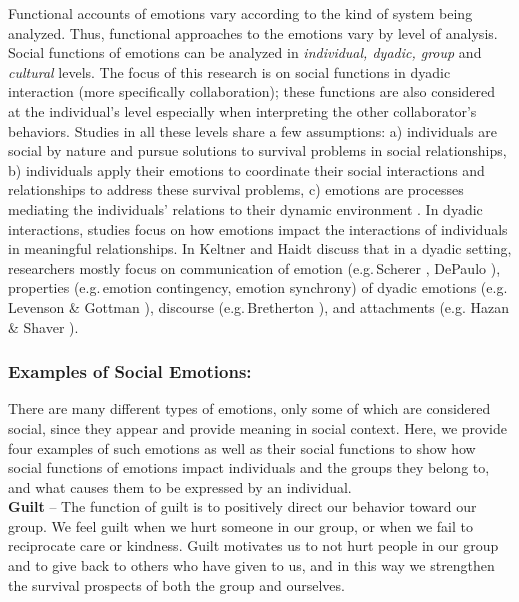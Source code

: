 \documentclass[12pt]{report}
\begin{document}
Functional accounts of emotions vary according to the kind of system being
analyzed. Thus, functional approaches to the emotions vary by level of analysis.
Social functions of emotions can be analyzed in \textit{individual, dyadic,
group} and \textit{cultural} levels. The focus of this research is on social
functions in dyadic interaction (more specifically collaboration); these
functions are also considered at the individual's level especially when
interpreting the other collaborator's behaviors. Studies in all these levels
share a few assumptions: a) individuals are social by nature and pursue
solutions to survival problems in social relationships, b) individuals apply
their emotions to coordinate their social interactions and relationships to
address these survival problems, c) emotions are processes mediating the
individuals' relations to their dynamic environment
\cite{keltner:emotion-functions}. In dyadic interactions, studies focus on how
emotions impact the interactions of individuals in meaningful relationships. In
\cite{keltner:emotion-functions} Keltner and Haidt discuss that in a dyadic
setting, researchers mostly focus on communication of emotion (e.g.\,Scherer
\cite{scherer:vocal-expression}, DePaulo \cite{depaulo:nonverbal-behavior}),
properties (e.g.\,emotion contingency, emotion synchrony) of dyadic emotions
(e.g.\,Levenson \& Gottman \cite{levenson:affective-exchange}), discourse
(e.g.\,Bretherton \cite{bretherton:emotions-functionalist}), and attachments
(e.g. Hazan \& Shaver \cite{hazan:emotion-attachment}).

\subsubsection{Examples of Social Emotions:}

There are many different types of emotions, only some of which are considered
social, since they appear and provide meaning in social context. Here, we
provide four examples of such emotions as well as their social functions to
show how social functions of emotions impact individuals and the groups they
belong to, and what causes them to be expressed by an individual.\\

\noindent \textbf{Guilt} -- The function of guilt is to positively direct our
behavior toward our group. We feel guilt when we hurt someone in our group, or
when we fail to reciprocate care or kindness. Guilt motivates us to not hurt
people in our group and to give back to others who have given to us, and in this
way we strengthen the survival prospects of both the group and ourselves.
\end{document}

